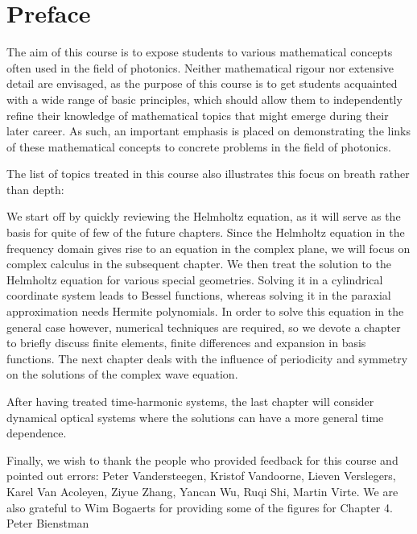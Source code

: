 \chapter{Preface}
\label{h:Preface}

The aim of this course is to expose students to various mathematical concepts often used in the field of photonics. Neither mathematical rigour nor extensive detail are envisaged, as the purpose of this course is to get students acquainted with a wide range of basic principles, which should allow them to independently refine their knowledge of mathematical topics that might emerge during their later career. As such, an important emphasis is placed on demonstrating the links of these mathematical concepts to concrete problems in the field of photonics.

The list of topics treated in this course also illustrates this focus on breath rather than depth:

We start off by quickly reviewing the Helmholtz equation, as it will serve as the basis for quite of few of the future chapters. Since the Helmholtz equation in the frequency domain gives rise to an equation in the complex plane, we will focus on complex calculus in the subsequent chapter. We then treat the solution to the Helmholtz equation for various special geometries. Solving it in a cylindrical coordinate system leads to Bessel functions, whereas solving it in the paraxial approximation needs Hermite polynomials. In order to solve this equation in the general case however, numerical techniques are required, so we devote a chapter to briefly discuss finite elements, finite differences and expansion in basis functions. The next chapter deals with the influence of periodicity and symmetry on the solutions of the complex wave equation.

After having treated time-harmonic systems, the last chapter will consider dynamical optical systems where the solutions can have a more general time dependence.

Finally, we wish to thank the people who provided feedback for this course and pointed out errors: Peter Vandersteegen, Kristof Vandoorne, Lieven Verslegers, Karel Van Acoleyen, Ziyue Zhang, Yancan Wu, Ruqi Shi, Martin Virte. We are also grateful to Wim Bogaerts for providing some of the figures for Chapter 4.\\[1cm]

\hspace{10cm} Peter Bienstman

